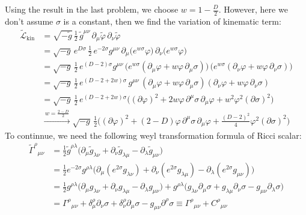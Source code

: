 \begin{solution}[27.3]
	Using the result in the last problem, we choose $w=1-\frac{D}{2}$. However, here we don't assume $\sigma$ is a constant, then we find the variation of kinematic term:
$$
\begin{aligned}
	\tilde{\mathcal L}_{\mathrm{kin}}
	&= \sqrt{-\tilde g}\,\frac12\,\tilde g^{\mu\nu}\,\partial_\mu\tilde\varphi\,\partial_\nu\tilde\varphi\\
	&= \sqrt{-g}\,e^{D\sigma}\,\frac12\,e^{-2\sigma}g^{\mu\nu}\,\partial_\mu\!\big(e^{w\sigma}\varphi\big)\,\partial_\nu\!\big(e^{w\sigma}\varphi\big)\\
	&= \sqrt{-g}\,\frac12\,e^{(D-2)\sigma}g^{\mu\nu}\,
	\big(e^{w\sigma}(\partial_\mu\varphi+w\varphi\,\partial_\mu\sigma)\big)\,
	\big(e^{w\sigma}(\partial_\nu\varphi+w\varphi\,\partial_\nu\sigma)\big)\\
	&= \sqrt{-g}\,\frac12\,e^{(D-2+2w)\sigma}\,g^{\mu\nu}\,
	(\partial_\mu\varphi+w\varphi\,\partial_\mu\sigma)(\partial_\nu\varphi+w\varphi\,\partial_\nu\sigma)\\
	&= \sqrt{-g}\,\frac12\,e^{(D-2+2w)\sigma}\Big((\partial\varphi)^2+2w\varphi\,\partial^\mu\sigma\,\partial_\mu\varphi+w^2\varphi^2(\partial\sigma)^2\Big)\\
	&\xrightarrow{\,w=\frac{2-D}{2}\,}
	\sqrt{-g}\,\frac12\Big((\partial\varphi)^2+(2-D)\varphi\,\partial^\mu\sigma\,\partial_\mu\varphi+\frac{(D-2)^2}{4}\varphi^2(\partial\sigma)^2\Big)
\end{aligned}
$$
To continnue, we need the following weyl transformation formula of Ricci scalar:
\[
\begin{aligned}
	\tilde\Gamma^{\rho}{}_{\mu\nu}
	&=\frac12\tilde g^{\rho\lambda}\Big(\partial_\mu\tilde g_{\lambda\nu}+\partial_\nu\tilde g_{\lambda\mu}-\partial_\lambda\tilde g_{\mu\nu}\Big)\\
	&=\frac12 e^{-2\sigma} g^{\rho\lambda}\Big(\partial_\mu(e^{2\sigma}g_{\lambda\nu})+\partial_\nu(e^{2\sigma}g_{\lambda\mu})-\partial_\lambda(e^{2\sigma}g_{\mu\nu})\Big)\\
	&=\frac12 g^{\rho\lambda}\Big(\partial_\mu g_{\lambda\nu}+\partial_\nu g_{\lambda\mu}-\partial_\lambda g_{\mu\nu}\Big)
	+g^{\rho\lambda}\Big(g_{\lambda\nu}\partial_\mu\sigma+g_{\lambda\mu}\partial_\nu\sigma-g_{\mu\nu}\partial_\lambda\sigma\Big)\\
	&=\Gamma^{\rho}{}_{\mu\nu}+\delta^\rho_\mu\partial_\nu\sigma+\delta^\rho_\nu\partial_\mu\sigma-g_{\mu\nu}\partial^\rho\sigma
	\equiv \Gamma^{\rho}{}_{\mu\nu}+C^{\rho}{}_{\mu\nu}
\end{aligned}
\]
\end{solution}
